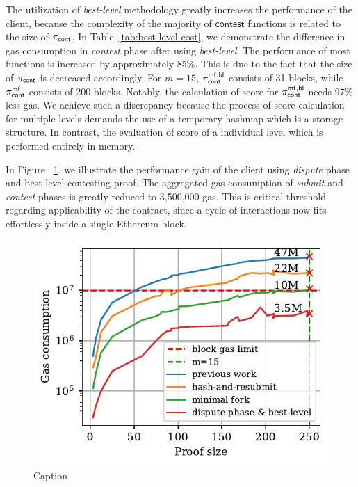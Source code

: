 The utilization of \emph{best-level} methodology greatly increases the
performance of the client, because the complexity of the majority of
$\textsf{contest}$ functions is related to the size of $\mathsf{\pi_{cont}}$. In
Table~\ref{tab:best-level-cost}, we demonstrate the difference in gas
consumption in \emph{contest} phase after using \emph{best-level}. The
performance of most functions is increased by approximately 85\%. This is due
to the fact that the size of $\mathsf{\pi_{cont}}$ is decreased accordingly. For $m=15$,
$\mathsf{\pi_{cont}^{mf, bl}}$ consists of 31 blocks, while $\mathsf{\pi_{cont}^{mf}}$ consists of 200 blocks.
Notably, the calculation of score for $\mathsf{\pi_{cont}^{mf, bl}}$ needs 97\% less gas. We achieve
such a discrepancy because the process of score calculation for multiple levels
demands the use of a temporary hashmap which is a storage structure. In
contrast, the evaluation of score of a individual level which is performed
entirely in memory.



In Figure ~\ref{fig:dispute-best-level}, we illustrate the performance gain of
the client using \emph{dispute} phase and best-level contesting proof. The
aggregated gas consumption of \emph{submit} and \emph{contest} phases is
greatly reduced to 3,500,000 gas. This is critical threshold regarding
applicability of the contract, since a cycle of interactions now fits
effortlessly inside a single Ethereum block.



\begin{figure}[!h]
    \begin{center}
        \includegraphics[width=1\columnwidth]{figures/dispute-best-level.pdf}
    \end{center}
    \caption{Caption}
    \label{fig:dispute-best-level}
\end{figure}
